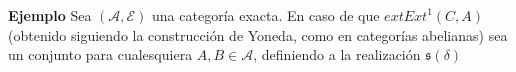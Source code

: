 \documentclass[preview]{standalone}
\begin{document}
\begin{center}
\justifying \textbf{Ejemplo} Sea $(\mathscr{A},\mathscr{E})$ una categoría exacta. En caso de que $	ext{Ext}^1(C,A)$ (obtenido siguiendo la construcción de Yoneda, como en categorías abelianas) sea un conjunto para cualesquiera $A,B\in\mathscr{A}$, definiendo a la realización $\mathfrak{s}(\delta)$
\end{center}
\end{document}
